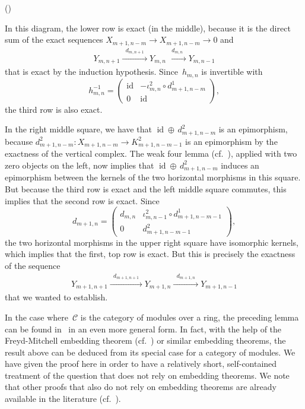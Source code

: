 \documentclass[12pt]{article}
\makeatletter
\newcounter{num}
\newenvironment{pflist}{\begin{list}{(\arabic{num})}{\usecounter{num} \leftmargin0cm \itemindent5pt}}{\end{list}}
\theoremstyle{definition}
\theoremstyle{break}
\renewenvironment{proof}[1][\proofname]{\par
\vspace{-5pt}%
\pushQED{\qed}%
\normalfont
\topsep0pt \partopsep0pt %
\trivlist
\item[\hskip\labelsep
\bfseries
#1\@addpunct{.}]\ignorespaces
}{%
\popQED\endtrivlist\@endpefalse
\addvspace{6pt plus 6pt} %
}
\newcommand{\CC}{\mathcal{C}}
\DeclareMathOperator\id{id}
\renewcommand{\1}{\mathbbm{1}}
\makeatother
\begin{document}
\begin{proof}
\begin{pflist}
\item
In this diagram, the lower row is exact (in the middle), because it is the direct sum of the exact sequences $X_{m+1,n-m} \to X_{m+1,n-m} \to 0$ and
\begin{align*}
Y_{m,n+1} \xrightarrow{\; \; d_{m,n+1} \; \;}  Y_{m,n}
\xrightarrow{\; \; d_{m,n} \; \;} Y_{m,n-1}
\end{align*}
that is exact by the induction hypothesis. Since~$h_{m,n}$ is invertible with
\[h_{m,n}^{-1} = \begin{pmatrix}
\id & - \iota^2_{m,n} \circ d^1_{m+1,n-m} \\
0 & \id
\end{pmatrix},\]
the third row is also exact.

In the right middle square, we have that $\id \oplus \, d^2_{m+1,n-m}$ is an epimorphism, because $d^2_{m+1,n-m} \colon X_{m+1,n-m} \to K^2_{m+1,n-m-1}$ is an epimorphism by the exactness of the vertical complex. The weak four lemma (cf.~\cite[Chap.~XII, \S~3, Lem.~3.1 (ii), p.~364]{ML1}), applied with two zero objects on the left, now implies that
$\id \oplus \, d^2_{m+1,n-m}$ induces an epimorphism between the kernels of the two horizontal morphisms in this square. But because the third row is exact and the left middle square commutes, this implies that the second row is exact. Since
\[d_{m+1,n} =
\begin{pmatrix}
d_{m,n} & \iota^2_{m,n-1} \circ d^1_{m+1,n-m-1} \\
0 & d^2_{m+1,n-m-1}
\end{pmatrix},
\]
the two horizontal morphisms in the upper right square have isomorphic kernels, which implies that the first, top row is exact. But this is precisely the exactness of the sequence
\begin{align*}
Y_{m+1,n+1} \xrightarrow{\; \; d_{m+1,n+1} \; \;} Y_{m+1,n}
\xrightarrow{\; \; d_{m+1,n} \; \;}  Y_{m+1,n-1}
\end{align*}
that we wanted to establish.
\qedhere
\end{pflist}
\end{proof}

In the case where~$\CC$ is the category of modules over a ring, the preceding lemma can be found in~\cite[Lem.~2.7.3, p.~59]{We} in an even more general form. In fact, with the help of the Freyd-Mitchell embedding theorem (cf.~\cite[Chap.~VI, Thm.~7.2, p.~151]{Mi}) or similar embedding theorems, the result above can be deduced from its special case for a category of modules. We have given the proof here in order to have a relatively short, self-contained treatment of the question that does not rely on embedding theorems. We note that other proofs that also do not rely on embedding theorems are already available in the literature (cf.~\cite[Cor.~6.8, p.~87]{Bg}).
\end{document}
